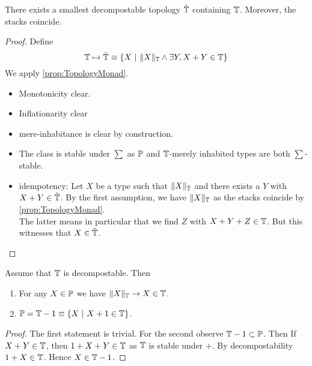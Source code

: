 \begin{prop}
	There exists a smallest decompostable topology $\tilde {\mathbb{T}}$ containing $\mathbb{T}$. Moreover, the stacks coincide.	
\end{prop}
\begin{proof}
	Define
	\[
	\bT \mapsto \tilde \bT \equiv \{X \ | \ \|X\|_{\bT} \land \exists Y , X + Y \in \bT \} %
	\]
	We apply \ref{prop:TopologyMonad}.
	\begin{itemize}
		\item Monotonicity clear.
		\item Inflationarity clear
		\item mere-inhabitance is clear by construction.
\item 	The class is stable under $\sum$  as $\mathbb{P}$ and $\mathbb{T}$-merely inhabited types are both  $\sum$-stable. \\
	\item idempotency: %
Let $X$ be a type such that $\|X\|_{\tilde {\mathbb{T}}}$ and there exists a $Y$  with $X + Y \in \tilde {\mathbb{T}}$. By the first assumption, we have $\|X\|_{\mathbb{T}}$ as the stacks coincide by \ref{prop:TopologyMonad}. \\
The latter means in particular that we find $Z$ with $X + Y + Z \in \mathbb{T}$. But this witnesses that $X  \in \tilde {\mathbb{T}}$.		
\end{itemize}

\end{proof}
\begin{prop}
	Assume that $\mathbb{T}$ is decompostable. Then 
	\begin{enumerate}
			\item For any $X \in \mathbb{P}$ we have $\|X\|_{\mathbb{T}} \to X \in \mathbb{T}$.
			\item $\mathbb{P} = \mathbb{T} - 1 \equiv \{X \ | \ X + 1 \in \mathbb{T}\}$.
	\end{enumerate}
\end{prop}
\begin{proof}
	The first statement is trivial.
	For the second observe $\mathbb{T} - 1 \subset \mathbb{P}$. Then If $X + Y \in \mathbb{T}$, then $1 + X + Y \in \mathbb{T}$ as $\mathbb{T}$ is stable under $+$. By decompostability $1 + X \in \mathbb{T}$. Hence $X \in \mathbb{T} - 1$. %
	
\end{proof}